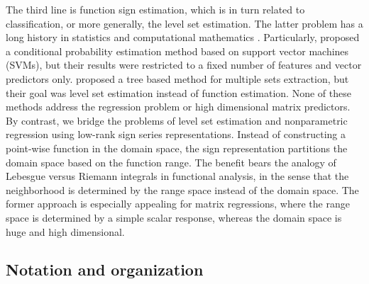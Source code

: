 \documentclass[11pt]{article}
\theoremstyle{plain}
\theoremstyle{definition}
\begin{document}
The third line is function sign estimation, which is in turn related to classification, or more generally, the level set estimation. The latter problem has a long history in statistics \citep{tsybakov1997nonparametric} and computational mathematics \citep{gibou2018review}. Particularly, \cite{wang2008probability} proposed a conditional probability estimation method based on support vector machines (SVMs), but their results were restricted to a fixed number of features and vector predictors only. \cite{singh2009adaptive} proposed a tree based method for multiple sets extraction, but their goal was level set estimation instead of function estimation. None of these methods address the regression problem or high dimensional matrix predictors. By contrast, we bridge the problems of level set estimation and nonparametric regression using low-rank sign series representations. Instead of constructing a point-wise function in the domain space, the sign representation partitions the domain space based on the function range. The benefit bears the analogy of Lebesgue versus Riemann integrals in functional analysis, in the sense that the neighborhood is determined by the range space instead of the domain space. The former approach is especially appealing for matrix regressions, where the range space is determined by a simple scalar response, whereas the domain space is huge and high dimensional. 



\subsection{Notation and organization}
\end{document}
